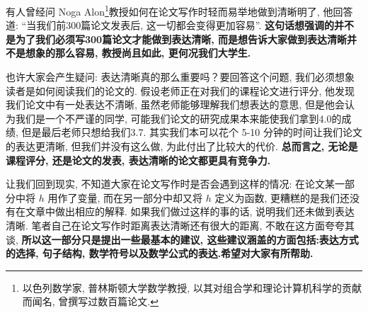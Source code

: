 \documentclass{booki}
\begin{document}
有人曾经问 Noga Alon\footnote{以色列数学家, 普林斯顿大学数学教授, 以其对组合学和理论计算机科学的贡献而闻名, 曾撰写过数百篇论文.}教授如何在论文写作时轻而易举地做到清晰明了, 他回答道: {``}当我们前300篇论文发表后, 这一切都会变得更加容易''\cite{pakhow}. \textbf{这句话想强调的并不是为了我们必须写300篇论文才能做到表达清晰, 而是想告诉大家做到表达清晰并不是想象的那么容易, 教授尚且如此, 更何况我们大学生.} \par
也许大家会产生疑问: 表达清晰真的那么重要吗？要回答这个问题, 我们必须想象读者是如何阅读我们的论文的. 假设老师正在对我们的课程论文进行评分, 他发现我们论文中有一处表达不清晰, 虽然老师能够理解我们想表达的意思, 但是他会认为我们是一个不严谨的同学, 可能我们论文的研究成果本来能使我们拿到4.0的成绩, 但是最后老师只想给我们3.7. 其实我们本可以花个 5-10 分钟的时间让我们论文的表达更清晰, 但我们并没有这么做, 为此付出了比较大的代价. \textbf{总而言之, 无论是课程评分, 还是论文的发表, 表达清晰的论文都更具有竞争力.} \par
让我们回到现实, 不知道大家在论文写作时是否会遇到这样的情况: 在论文某一部分中将 $h$ 用作了变量, 而在另一部分中却又将 $h$ 定义为函数, 更糟糕的是我们还没有在文章中做出相应的解释. 如果我们做过这样的事的话, 说明我们还未做到表达清晰. 笔者自己在论文写作时距离表达清晰还有很大的距离, 不敢在这方面夸夸其谈, \textbf{所以这一部分只是提出一些最基本的建议, {这些建议涵盖的方面包括:表达方式的选择, 句子结构, 数学符号以及数学公式的表达}.希望对大家有所帮助. }
\end{document}
